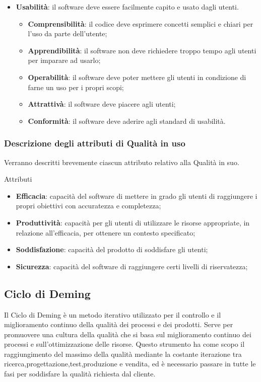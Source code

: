 \documentclass[../piano-di-qualifica.tex]{subfiles}
\begin{document}
\begin{itemize}
        \item \textbf{Usabilità}: il software deve essere facilmente capito e usato dagli utenti.
        \begin{itemize}
            \item \textbf{Comprensibilità}: il codice deve esprimere concetti semplici e chiari per l'uso da parte dell'utente;
            \item \textbf{Apprendibilità}: il software non deve richiedere troppo tempo agli utenti per imparare ad usarlo;
            \item \textbf{Operabilità}: il software deve poter mettere gli utenti in condizione di farne un uso per i propri scopi;
            \item \textbf{Attrattivà}: il software deve piacere agli utenti;
            \item \textbf{Conformità}: il software deve aderire agli standard di usabilità.
        \end{itemize}
\end{itemize}


\subsubsection{Descrizione degli attributi di Qualità in uso}%
\label{sec:descrizione_attributi_in_uso}
Verranno descritti brevemente ciascun attributo relativo alla Qualità in suo.

Attributi
\begin{itemize}
    \item \textbf{Efficacia}: capacità del software di mettere in grado gli utenti di raggiungere i propri obiettivi con accuratezza e completezza;
    \item \textbf{Produttività}: capacità per gli utenti di utilizzare le risorse appropriate, in relazione all'efficacia, per ottenere un contesto specificato;
    \item \textbf{Soddisfazione}: capacità del prodotto di soddisfare gli utenti;
    \item \textbf{Sicurezza}: capacità del software di raggiungere certi livelli di riservatezza;
\end{itemize}

\subsection{Ciclo di Deming}%
\label{sec:ciclo_di_deming}
Il Ciclo di Deming è un metodo iterativo utilizzato per il controllo e il miglioramento continuo della qualità dei processi e dei prodotti.
Serve per promuovere una cultura della qualità che si basa sul miglioramento continuo dei processi e sull'ottimizzazione delle risorse.
Questo strumento ha come scopo il raggiungimento del massimo della qualità mediante la costante iterazione tra ricerca,progettazione,test,produzione e vendita, ed è necessario passare in tutte le fasi per soddisfare la qualità richiesta dal cliente.
\end{document}
